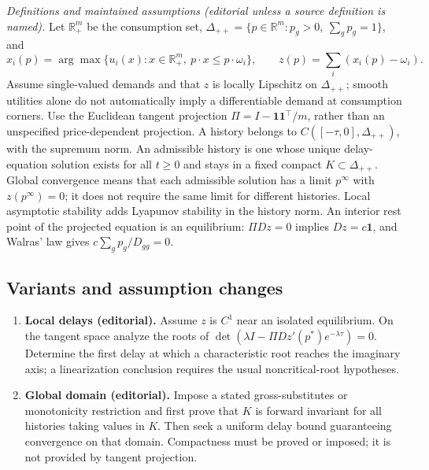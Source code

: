 \documentclass[11pt,a4paper]{article}
\begin{document}
\emph{Definitions and maintained assumptions (editorial unless a source definition is named).} Let \(\mathbb R_+^m\) be the consumption set, \(\Delta_{++}=\{p\in\mathbb R^m:p_g>0,\ \sum_g p_g=1\}\), and
\[x_i(p)=\arg\max\{u_i(x):x\in\mathbb R_+^m,\ p\cdot x\le p\cdot\omega_i\},\qquad z(p)=\sum_i(x_i(p)-\omega_i).\]
Assume single-valued demands and that \(z\) is locally Lipschitz on \(\Delta_{++}\); smooth utilities alone do not automatically imply a differentiable demand at consumption corners. Use the Euclidean tangent projection \(\Pi=I-\mathbf1\mathbf1^\top/m\), rather than an unspecified price-dependent projection. A history belongs to \(C([-\tau,0],\Delta_{++})\), with the supremum norm. An admissible history is one whose unique delay-equation solution exists for all \(t\ge0\) and stays in a fixed compact \(K\subset\Delta_{++}\). Global convergence means that each admissible solution has a limit \(p^\infty\) with \(z(p^\infty)=0\); it does not require the same limit for different histories. Local asymptotic stability adds Lyapunov stability in the history norm. An interior rest point of the projected equation is an equilibrium: \(\Pi Dz=0\) implies \(Dz=c\mathbf1\), and Walras' law gives \(c\sum_g p_g/D_{gg}=0\).
\subsection*{Variants and assumption changes}
\begin{enumerate}
\item \textbf{Local delays (editorial).} Assume \(z\) is \(C^1\) near an isolated equilibrium. On the tangent space analyze the roots of \(\det(\lambda I-\Pi Dz'(p^*)e^{-\lambda\tau})=0\). Determine the first delay at which a characteristic root reaches the imaginary axis; a linearization conclusion requires the usual noncritical-root hypotheses.
\item \textbf{Global domain (editorial).} Impose a stated gross-substitutes or monotonicity restriction and first prove that \(K\) is forward invariant for all histories taking values in \(K\). Then seek a uniform delay bound guaranteeing convergence on that domain. Compactness must be proved or imposed; it is not provided by tangent projection.
\end{enumerate}
\end{document}
